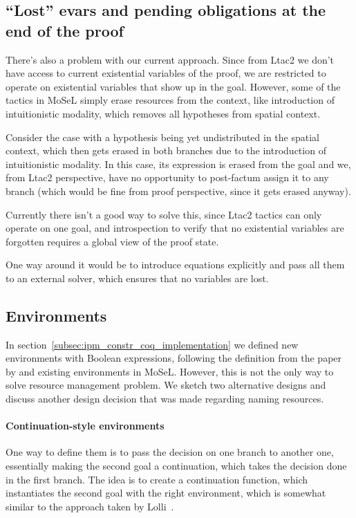 \subsection{``Lost'' evars and pending obligations at the end of the proof}
\label{subsec:hanging-obligations}

There's also a problem with our current approach.
Since from Ltac2 we don't have access to current existential variables of the proof, we are restricted to operate on existential variables that show up in the goal.
However, some of the tactics in MoSeL simply erase resources from the context, like introduction of intuitionistic modality, which removes all hypotheses from spatial context.

Consider the case with a hypothesis being yet undistributed in the spatial context, which then gets erased in both branches due to the introduction of intuitionistic modality.
In this case, its expression is erased from the goal and we, from Ltac2 perspective, have no opportunity to post-factum assign it to any branch (which would be fine from proof perspective, since it gets erased anyway).

Currently there isn't a good way to solve this, since Ltac2 tactics can only operate on one goal, and introspection to verify that no existential variables are forgotten requires a global view of the proof state.

One way around it would be to introduce equations explicitly and pass all them to an external solver, which ensures that no variables are lost.

\subsection{Environments}
\label{subsec:environments}

In section~\ref{subsec:ipm_constr_coq_implementation} we defined new environments with Boolean expressions, following the definition from the paper by \citet{harlandResourceDistributionBooleanConstraints2003} and existing environments in MoSeL.
However, this is not the only way to solve resource management problem.
We sketch two alternative designs and discuss another design decision that was made regarding naming resources.

\paragraph{Continuation-style environments}

One way to define them is to pass the decision on one branch to another one, essentially making the second goal a continuation, which takes the decision done in the first branch.
The idea is to create a continuation function, which instantiates the second goal with the right environment, which is somewhat similar to the approach taken by Lolli~\cite{LolliLinearLogic}.


